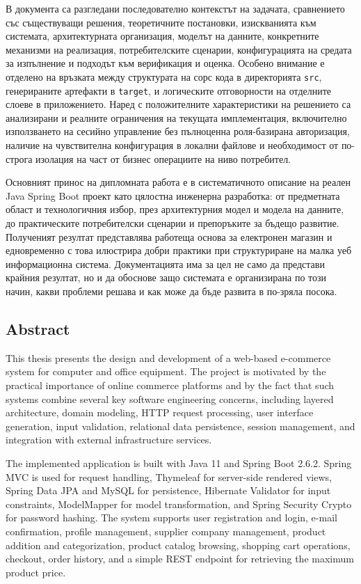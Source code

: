 В документа са разгледани последователно контекстът на задачата, сравнението със съществуващи решения, теоретичните постановки, изискванията към системата, архитектурната организация, моделът на данните, конкретните механизми на реализация, потребителските сценарии, конфигурацията на средата за изпълнение и подходът към верификация и оценка. Особено внимание е отделено на връзката между структурата на сорс кода в директорията \texttt{src}, генерираните артефакти в \texttt{target}, и логическите отговорности на отделните слоеве в приложението. Наред с положителните характеристики на решението са анализирани и реалните ограничения на текущата имплементация, включително използването на сесийно управление без пълноценна роля-базирана авторизация, наличие на чувствителна конфигурация в локални файлове и необходимост от по-строга изолация на част от бизнес операциите на ниво потребител.

Основният принос на дипломната работа е в систематичното описание на реален Java Spring Boot проект като цялостна инженерна разработка: от предметната област и технологичния избор, през архитектурния модел и модела на данните, до практическите потребителски сценарии и препоръките за бъдещо развитие. Полученият резултат представлява работеща основа за електронен магазин и едновременно с това илюстрира добри практики при структуриране на малка уеб информационна система. Документацията има за цел не само да представи крайния резултат, но и да обоснове защо системата е организирана по този начин, какви проблеми решава и как може да бъде развита в по-зряла посока.

\subsection{Abstract}

This thesis presents the design and development of a web-based e-commerce system for computer and office equipment. The project is motivated by the practical importance of online commerce platforms and by the fact that such systems combine several key software engineering concerns, including layered architecture, domain modeling, HTTP request processing, user interface generation, input validation, relational data persistence, session management, and integration with external infrastructure services.

The implemented application is built with Java 11 and Spring Boot 2.6.2. Spring MVC is used for request handling, Thymeleaf for server-side rendered views, Spring Data JPA and MySQL for persistence, Hibernate Validator for input constraints, ModelMapper for model transformation, and Spring Security Crypto for password hashing. The system supports user registration and login, e-mail confirmation, profile management, supplier company management, product addition and categorization, product catalog browsing, shopping cart operations, checkout, order history, and a simple REST endpoint for retrieving the maximum product price.

